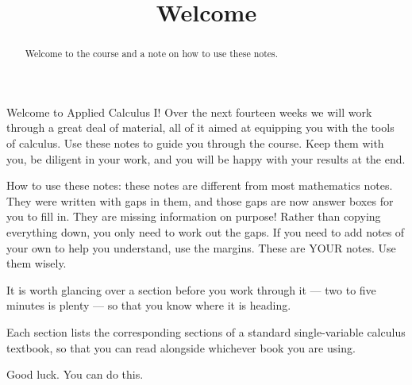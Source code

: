 \documentclass{ximera}
\title{Welcome}
\begin{document}
\begin{abstract}
Welcome to the course and a note on how to use these notes.
\end{abstract}
\maketitle
Welcome to Applied Calculus I! Over the next fourteen weeks we will work through a great deal of material, all of it aimed at equipping you with the tools of calculus. Use these notes to guide you through the course. Keep them with you, be diligent in your work, and you will be happy with your results at the end.

How to use these notes: these notes are different from most mathematics notes. They were written with gaps in them, and those gaps are now answer boxes for you to fill in. They are missing information on purpose! Rather than copying everything down, you only need to work out the gaps. If you need to add notes of your own to help you understand, use the margins. These are YOUR notes. Use them wisely.

It is worth glancing over a section before you work through it --- two to five minutes is plenty --- so that you know where it is heading.

Each section lists the corresponding sections of a standard single-variable calculus textbook, so that you can read alongside whichever book you are using.

Good luck. You can do this.
\end{document}

